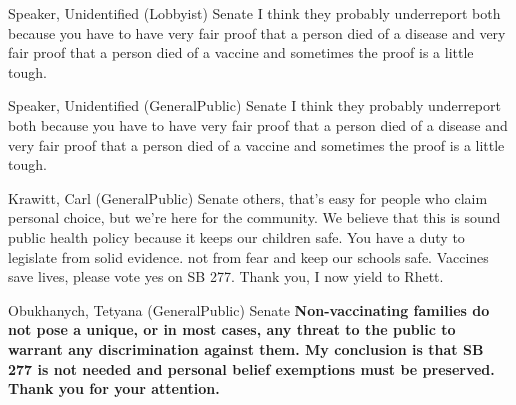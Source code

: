 \begin{result}{9.241784334021503}{Speaker, Unidentified (Lobbyist) Senate}
I think they probably underreport both because you have to have very fair proof that a person died of a disease and very fair proof that a person died of a vaccine and sometimes the proof is a little tough.
\end{result}

\begin{result}{9.241784334021503}{Speaker, Unidentified (GeneralPublic) Senate}
I think they probably underreport both because you have to have very fair proof that a person died of a disease and very fair proof that a person died of a vaccine and sometimes the proof is a little tough.
\end{result}

\begin{result}{9.212042150184399}{Krawitt, Carl (GeneralPublic) Senate}
others, that's easy for people who claim personal choice, but we're here for the community. We believe that this is sound public health policy because it keeps our children safe. You have a duty to legislate from solid evidence. not from fear and keep our schools safe. Vaccines save lives, please vote yes on SB 277. Thank you, I now yield to Rhett.
\end{result}

\begin{result}{9.155087277710894}{Obukhanych, Tetyana (GeneralPublic) Senate}
\textbf{Non-vaccinating families do not pose a unique, or in most cases, any threat to the public to warrant any discrimination against them. My conclusion is that SB 277 is not needed and personal belief exemptions must be preserved. Thank you for your attention.
}\end{result}

